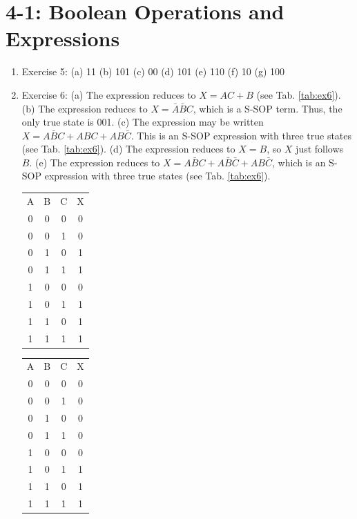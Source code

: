 \documentclass[10pt]{article}
\begin{document}
\maketitle

\section{4-1: Boolean Operations and Expressions}

\begin{enumerate}
\item Exercise 5: (a) 11 (b) 101 (c) 00 (d) 101 (e) 110 (f) 10 (g) 100
\item Exercise 6: (a) The expression reduces to $X = AC+B$ (see Tab. \ref{tab:ex6}). (b) The expression reduces to $X = \bar{A}\bar{B}C$, which is a S-SOP term.  Thus, the only true state is 001. (c) The expression may be written $X = A\bar{B}C + ABC + AB\bar{C}$.  This is an S-SOP expression with three true states (see Tab. \ref{tab:ex6}). (d) The expression reduces to $X = B$, so $X$ just follows $B$. (e) The expression reduces to $X = A\bar{B}C + A\bar{B}\bar{C} + AB\bar{C}$, which is an S-SOP expression with three true states (see Tab. \ref{tab:ex6}).
\begin{table}[ht]
\centering
\begin{tabular}{| c | c | c | c |}
\hline
A & B & C & X \\
0 & 0 & 0 & 0 \\
0 & 0 & 1 & 0 \\
0 & 1 & 0 & 1 \\
0 & 1 & 1 & 1 \\
1 & 0 & 0 & 0 \\
1 & 0 & 1 & 1 \\
1 & 1 & 0 & 1 \\
1 & 1 & 1 & 1 \\
\hline
\end{tabular}
\begin{tabular}{| c | c | c | c |}
\hline
A & B & C & X \\
0 & 0 & 0 & 0 \\
0 & 0 & 1 & 0 \\
0 & 1 & 0 & 0 \\
0 & 1 & 1 & 0 \\
1 & 0 & 0 & 0 \\
1 & 0 & 1 & 1 \\
1 & 1 & 0 & 1 \\
1 & 1 & 1 & 1 \\
\hline
\end{tabular}

\end{table}
\end{enumerate}
\end{document}
